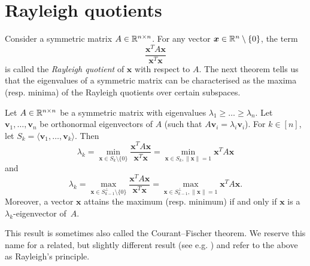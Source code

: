 \section{Rayleigh quotients}
Consider a symmetric matrix $A \in \mathbb{R}^{n \times n}$. For any vector $\bm{x} \in \mathbb{R}^n \setminus \{0\}$, the term 
\begin{equation*}
    \frac{\bm{x}^T A \bm{x}}{\bm{x}^T \bm{x}}
\end{equation*}
is called the \textit{Rayleigh quotient} of $\bm{x}$ with respect to $A$.
The next theorem tells us that the eigenvalues of a symmetric matrix can be characterised as the maxima (resp. minima) of the Rayleigh quotients over certain subspaces. 

\begin{theorem}[Rayleigh] \label{thm:rayleigh}
    Let $A \in \mathbb{R}^{n \times n}$ be a symmetric matrix with eigenvalues $\lambda_1 \ge \dots \ge \lambda_n$.
    Let $\bm{v}_1, \dots, \bm{v}_n$ be orthonormal eigenvectors of $A$ (such that $A \bm{v}_i = \lambda_i \bm{v}_i$).
    For $k \in [n]$, let $S_k = \langle \bm{v}_1, \dots, \bm{v}_k \rangle$. 
    Then
    \begin{equation*}
        \lambda_k = \min \limits_{\bm{x} \in S_k \setminus \{0 \}} \frac{\bm{x}^T A \bm{x}}{\bm{x}^T \bm{x}} = \min \limits_{\bm{x} \in S_k, \|\bm{x}\| = 1} \bm{x}^T A \bm{x}
    \end{equation*}
    and
    \begin{equation*}
        \lambda_k = \max \limits_{\bm{x} \in S_{k - 1}^{\perp} \setminus \{0 \}} \frac{\bm{x}^T A \bm{x}}{\bm{x}^T \bm{x}} = \max \limits_{\bm{x} \in S_{k - 1}^{\perp}, \| \bm{x} \| = 1} \bm{x}^T A \bm{x}.
    \end{equation*}
    Moreover, a vector $\bm{x}$ attains the maximum (resp. minimum) if and only if $\bm{x}$ is a $\lambda_k$-eigenvector \mbox{of $A$}.
\end{theorem}

This result is sometimes also called the Courant--Fischer theorem.
We reserve this name for a related, but slightly different result (see e.g. \cite[Theorem 4.2.6]{matrixanalysis}) and refer to the above as Rayleigh's principle.

